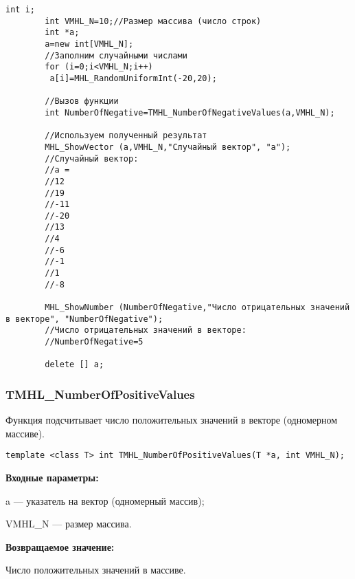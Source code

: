 \documentclass[a4paper,12pt]{article}
\begin{document}
\begin{lstlisting}[label=code_use_TMHL_NumberOfNegativeValues,caption=Пример использования]
        int i;
        int VMHL_N=10;//Размер массива (число строк)
        int *a;
        a=new int[VMHL_N];
        //Заполним случайными числами
        for (i=0;i<VMHL_N;i++)
         a[i]=MHL_RandomUniformInt(-20,20);

        //Вызов функции
        int NumberOfNegative=TMHL_NumberOfNegativeValues(a,VMHL_N);

        //Используем полученный результат
        MHL_ShowVector (a,VMHL_N,"Случайный вектор", "a");
        //Случайный вектор:
        //a =
        //12
        //19
        //-11
        //-20
        //13
        //4
        //-6
        //-1
        //1
        //-8

        MHL_ShowNumber (NumberOfNegative,"Число отрицательных значений в векторе", "NumberOfNegative");
        //Число отрицательных значений в векторе:
        //NumberOfNegative=5

        delete [] a;
\end{lstlisting}

\subsubsection{TMHL\_NumberOfPositiveValues}\label{TMHL_NumberOfPositiveValues}

Функция подсчитывает число положительных значений в векторе (одномерном массиве).


\begin{lstlisting}[label=code_syntax_TMHL_NumberOfPositiveValues,caption=Синтаксис]
template <class T> int TMHL_NumberOfPositiveValues(T *a, int VMHL_N);
\end{lstlisting}

\textbf{Входные параметры:}

 a --- указатель на вектор (одномерный массив);
 
 VMHL\_N --- размер массива.

\textbf{Возвращаемое значение:}

Число положительных значений в массиве.
\end{document}
